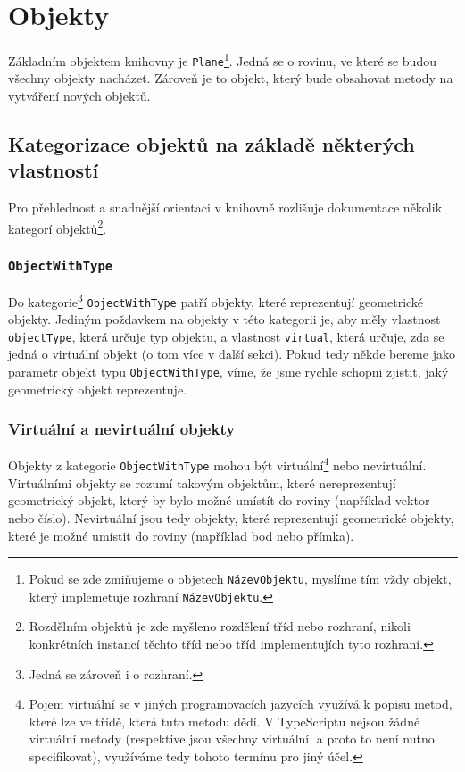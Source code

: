 \chapter{Objekty}
\label{chapter:objects}

Základním objektem knihovny je \texttt{Plane}\footnote{Pokud se zde zmiňujeme o objetech \texttt{NázevObjektu}, myslíme tím vždy objekt, který implemetuje rozhraní \texttt{NázevObjektu}.}. 
Jedná se o rovinu, ve které se budou všechny objekty nacházet.
Zároveň je to objekt, který bude obsahovat metody na vytváření nových objektů.

\section[Kategorizace]{Kategorizace objektů na základě některých vlastností}
\label{sec:object-categorization}

Pro přehlednost a snadnější orientaci v knihovně rozlišuje dokumentace několik kategorí objektů\footnote{Rozdělním objektů je zde myšleno rozdělení tříd nebo rozhraní, nikoli konkrétních instancí těchto tříd nebo tříd implementujích tyto rozhraní.}.

\subsection[ObjectWithType]{\texttt{ObjectWithType}}
\label{subsec:object-with-type}

Do kategorie\footnote{Jedná se zároveň i o rozhraní.} \texttt{ObjectWithType} patří objekty, které reprezentují geometrické objekty. 
Jediným poždavkem na objekty v této kategorii je, aby měly vlastnost \texttt{objectType}, která určuje typ objektu, a vlastnost \texttt{virtual}, která určuje, zda se jedná o virtuální objekt (o tom více v další sekci).
Pokud tedy někde bereme jako parametr objekt typu \texttt{ObjectWithType}, víme, že jsme rychle schopni zjistit, jaký geometrický objekt reprezentuje.

\subsection[Virtuální a nevirtuální]{Virtuální a nevirtuální objekty}
\label{subsec:virtual-and-non-virtual}

Objekty z kategorie \texttt{ObjectWithType} mohou být virtuální\footnote{Pojem virtuální se v jiných programovacích jazycích využívá k popisu metod, které lze  ve třídě, která tuto metodu dědí. V TypeScriptu nejsou žádné virtuální metody (respektive jsou všechny virtuální, a proto to není nutno specifikovat), využíváme tedy tohoto termínu pro jiný účel.} nebo nevirtuální.
Virtuálními objekty se rozumí takovým objektům, které nereprezentují geometrický objekt, který by bylo možné umístít do roviny (například vektor nebo číslo).
Nevirtuální jsou tedy objekty, které reprezentují geometrické objekty, které je možné umístit do roviny (například bod nebo přímka).

